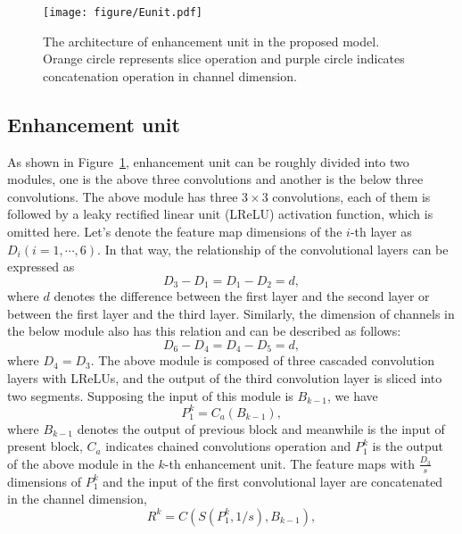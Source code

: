 \documentclass[10pt,twocolumn,letterpaper]{article}
\begin{document}
\begin{figure}[htb]
	\begin{center}
		\texttt{[image: figure/Eunit.pdf]}
	\end{center}
	\caption{The architecture of enhancement unit in the proposed model. Orange circle represents slice operation and purple circle indicates concatenation operation in channel dimension.}
	\label{fig:Eunit}
\end{figure}

\subsection{Enhancement unit}
As shown in Figure~\ref{fig:Eunit}, enhancement unit can be roughly divided into two modules, one is the above three convolutions and another is the below three convolutions. The above module has three $3 \times3 $ convolutions, each of them is followed by a leaky rectified linear unit (LReLU) activation function, which is omitted here. Let's denote the feature map dimensions of the $i$-th layer as ${D_i}\left( {i = 1, \cdots ,6} \right)$. In that way, the relationship of the convolutional layers can be expressed as
\begin{equation}
{D_3} - {D_1} = {D_1} - {D_2} = d,
\end{equation}
where $d$ denotes the difference between the first layer and the second layer or between the first layer and the third layer. Similarly, the dimension of channels in the below module also has this relation and can be described as follows:
\begin{equation}
{D_6} - {D_4} = {D_4} - {D_5} = d,
\end{equation}
where ${D_4} = {D_3}$. The above module is composed of three cascaded convolution layers with LReLUs, and the output of the third convolution layer is sliced into two segments. Supposing the input of this module is ${B_{k - 1}}$, we have
\begin{equation}
P_1^k = {C_a}\left( {{B_{k - 1}}} \right),
\end{equation}
where ${{B_{k - 1}}}$ denotes the output of previous block and meanwhile is the input of present block, ${C_a}$ indicates chained convolutions operation and $P_1^k$ is the output of the above module in the $k$-th enhancement unit. The feature maps with $ \frac{{{D_3}}}{s}$ dimensions of $P_1^k$ and the input of the first convolutional layer are concatenated in the channel dimension,
\begin{equation}
{R^k} = C\left( {S\left( {P_1^k,1/s} \right),{B_{k - 1}}} \right),
\end{equation}
\end{document}
